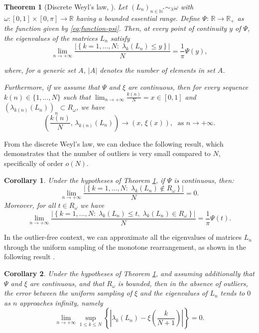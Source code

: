 \documentclass[11pt]{article}
\newtheorem{theorem}{Theorem}[section]
\newtheorem{corollary}{Corollary}[section]
\begin{document}
\begin{theorem} [Discrete Weyl’s law, \cite{bianchi2021analysis}]\label{th1}  
Let $(L_n)_{n\in\mathbb{N}^*} \sim_{\lambda} \omega$ with $\omega: [0,1] \times [0,\pi] \longrightarrow \mathbb{R}$  having a bounded essential range. Define $\Psi:\, \mathbb{R} \longrightarrow \mathbb{R}_+$ as the function given by \eqref{eq:function-psi}. Then, at every point of continuity $y$ of $\Psi$, the eigenvalues of the matrices $L_n$ satisfy  
\begin{equation}\label{conversdiscretwels}  
    \lim_{n\rightarrow  +\infty} \dfrac{\left| \left\{k=1,\dots, N:\; \lambda_{k}(L_n)\leq y\right\} \right|}{N}=\frac{1}{\pi}\Psi(y),  
\end{equation}  

where, for a generic set $A$, $|A|$ denotes the number of elements in set $A$.  

Furthermore,  if we assume that $\Psi$ and $\xi$ are continuous, then for every sequence $k(n)\in\{1,\dots,N\}$ such that $\lim_{n\rightarrow  +\infty} \frac{k(n)}{N}=x\in[0,1]$ and $(\lambda_{k(n)}(L_n))_n\subset  R_\omega$, we have    
\begin{equation}\label{discretweylslaw}  
    \left(\frac{k(n)}{N}, \, \lambda_{k(n)}(L_n)  \right)\longrightarrow (x,\, \xi(x)), \; \text{ as } n \longrightarrow +\infty.  
\end{equation}  
\end{theorem}  

From the discrete Weyl's law,  we can deduce the following result, which demonstrates that the number of outliers is very small compared to $N$, specifically of order $o(N)$.  
\begin{corollary} \label{numberofoutlierscor}  
Under the hypotheses of Theorem \ref{th1}, if $\Psi$ is continuous, then:  
$$  
\lim_{n\rightarrow  +\infty}\dfrac{\left| \left\{k=1,\dots, N:\; \lambda_{k}(L_n)\notin R_{\omega} \right\}\right|}{N}=0.  
$$  
Moreover, for all $t\in R_{\omega}$ we have   
$$  
\lim_{n\rightarrow  +\infty}\dfrac{\left| \left\{k=1,\dots, N:\; \lambda_{k}(L_n)\leq t,\;\lambda_{k}(L_n)\in R_{\omega} \right\}\right|}{N}=\frac{1}{\pi}\Psi(t).  
$$  
\end{corollary}  

In the outlier-free context, we can approximate all the eigenvalues of matrices $L_n$ through the uniform sampling of the monotone rearrangement, as shown in the following result \cite{bianchi2021analysis}.  

\begin{corollary}\label{cl1}  
Under the hypotheses of Theorem \ref{th1}, and assuming additionally that $\Psi$ and $\xi$ are continuous, and that $R_{\omega}$ is bounded, then in the  absence of outliers, the error between the uniform sampling of $\xi$ and the eigenvalues of $L_{n}$ tends to $0$ as $n$  approaches infinity, namely  
$$  
\lim_{ n \rightarrow + \infty} \sup_{1 \leq k \leq N}\left\{ \left| \lambda_{k}(L_n) - \xi\left(\frac{k}{N+1}\right)\right|  \right\} = 0.  
$$  
\end{corollary}  
\end{document}
